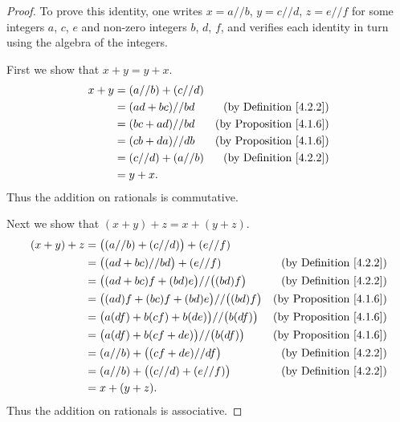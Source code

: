 \begin{proof}
    To prove this identity, one writes \(x = a // b\), \(y = c // d\), \(z = e // f\) for some integers \(a\), \(c\), \(e\) and non-zero integers \(b\), \(d\), \(f\), and verifies each identity in turn using the algebra of the integers.

    First we show that \(x + y = y + x\).
    \begin{align*}
        x + y & = (a // b) + (c // d)                                       \\
              & = (ad + bc) // bd     & \text{(by Definition \ref{4.2.2})}  \\
              & = (bc + ad) // bd     & \text{(by Proposition \ref{4.1.6})} \\
              & = (cb + da) // db     & \text{(by Proposition \ref{4.1.6})} \\
              & = (c // d) + (a // b) & \text{(by Definition \ref{4.2.2})}  \\
              & = y + x.
    \end{align*}
    Thus the addition on rationals is commutative.

    Next we show that \((x + y) + z = x + (y + z)\).
    \begin{align*}
        (x + y) + z & = \big((a // b) + (c // d)\big) + (e // f)                                                 \\
                    & = \big((ad + bc) // bd\big) + (e // f)               & \text{(by Definition \ref{4.2.2})}  \\
                    & = \big((ad + bc)f + (bd)e\big) // \big((bd)f\big)    & \text{(by Definition \ref{4.2.2})}  \\
                    & = \big((ad)f + (bc)f + (bd)e\big) // \big((bd)f\big) & \text{(by Proposition \ref{4.1.6})} \\
                    & = \big(a(df) + b(cf) + b(de)\big) // \big(b(df)\big) & \text{(by Proposition \ref{4.1.6})} \\
                    & = \big(a(df) + b(cf + de)\big) // \big(b(df)\big)    & \text{(by Proposition \ref{4.1.6})} \\
                    & = (a // b) + \big((cf + de) // df\big)               & \text{(by Definition \ref{4.2.2})}  \\
                    & = (a // b) + \big((c // d) + (e // f)\big)           & \text{(by Definition \ref{4.2.2})}  \\
                    & = x + (y + z).
    \end{align*}
    Thus the addition on rationals is associative.


\end{proof}
